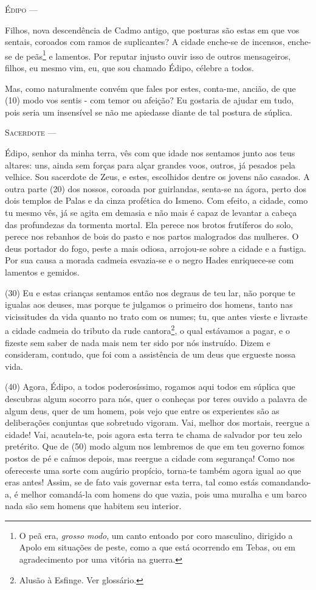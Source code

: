 \textsc{Édipo} ---

Filhos, nova descendência de Cadmo antigo, que posturas são estas em que
vos sentais, coroados com ramos de suplicantes? A cidade enche-se de
incensos, enche-se de peãs\footnote{O peã era, \emph{grosso modo}, um
  canto entoado por coro masculino, dirigido a Apolo em situações de
  peste, como a que está ocorrendo em Tebas, ou em agradecimento por uma
  vitória na guerra.} e lamentos. Por reputar injusto ouvir isso de
outros mensageiros, filhos, eu mesmo vim, eu, que sou chamado Édipo,
célebre a todos.

Mas, como naturalmente convém que fales por estes, conta-me, ancião, de
que (10) modo vos sentis - com temor ou afeição? Eu gostaria de ajudar
em tudo, pois seria um insensível se não me apiedasse diante de tal
postura de súplica.

\textsc{Sacerdote} ---

Édipo, senhor da minha terra, vês com que idade nos sentamos junto aos
teus altares: uns, ainda sem forças para alçar grandes voos, outros, já
pesados pela velhice. Sou sacerdote de Zeus, e estes, escolhidos dentre
os jovens não casados. A outra parte (20) dos nossos, coroada por
guirlandas, senta-se na ágora, perto dos dois templos de Palas e da
cinza profética do Ismeno. Com efeito, a cidade, como tu mesmo vês, já
se agita em demasia e não mais é capaz de levantar a cabeça das
profundezas da tormenta mortal. Ela perece nos brotos frutíferos do
solo, perece nos rebanhos de bois do pasto e nos partos malogrados das
mulheres. O deus portador do fogo, peste a mais odiosa, arrojou-se sobre
a cidade e a fustiga. Por sua causa a morada cadmeia esvazia-se e o
negro Hades enriquece-se com lamentos e gemidos.

(30) Eu e estas crianças sentamos então nos degraus de teu lar, não
porque te igualas aos deuses, mas porque te julgamos o primeiro dos
homens, tanto nas vicissitudes da vida quanto no trato com os numes; tu,
que antes vieste e livraste a cidade cadmeia do tributo da rude
cantora\footnote{Alusão à Esfinge. Ver glossário.}, o qual estávamos a
pagar, e o fizeste sem saber de nada mais nem ter sido por nós
instruído. Dizem e consideram, contudo, que foi com a assistência de um
deus que ergueste nossa vida.

(40) Agora, Édipo, a todos poderosíssimo, rogamos aqui todos em súplica
que descubras algum socorro para nós, quer o conheças por teres ouvido a
palavra de algum deus, quer de um homem, pois vejo que entre os
experientes são as deliberações conjuntas que sobretudo vigoram. Vai,
melhor dos mortais, reergue a cidade! Vai, acautela-te, pois agora esta
terra te chama de salvador por teu zelo pretérito. Que de (50) modo
algum nos lembremos de que em teu governo fomos postos de pé e caímos
depois, mas reergue a cidade com segurança! Como nos ofereceste uma
sorte com augúrio propício, torna-te também agora igual ao que eras
antes! Assim, se de fato vais governar esta terra, tal como estás
comandando-a, é melhor comandá-la com homens do que vazia, pois uma
muralha e um barco nada são sem homens que habitem seu interior.

